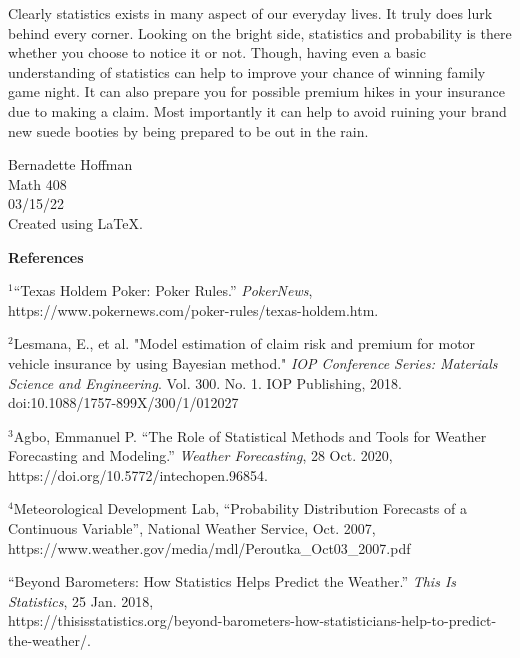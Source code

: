 \documentclass[11pt]{article}
\begin{document}
\bigskip

Clearly statistics exists in many aspect of our everyday lives. It truly does lurk behind every corner. Looking on the bright side, statistics and probability is there whether you choose to notice it or not. Though, having even a basic understanding of statistics can help to improve your chance of winning family game night. It can also prepare you for possible premium hikes in your insurance due to making a claim. Most importantly it can help to avoid ruining your brand new suede booties by being prepared to be out in the rain. 

\vspace{1in}
\begin{center}
Bernadette Hoffman \\
Math 408\\
03/15/22\\
Created using \LaTeX.
\end{center}

\newpage
\begin{center}
\Large \textbf{References}
\end{center}

\bigskip

\begin{small}

\noindent $^1$“Texas Holdem Poker: Poker Rules.” \textit{PokerNews}, 
https://www.pokernews.com/poker-rules/texas-holdem.htm.

\bigskip

\noindent $^2$Lesmana, E., et al. "Model estimation of claim risk and premium for motor vehicle insurance by using Bayesian method." \textit{IOP Conference Series: Materials Science and Engineering}. Vol. 300. No. 1. IOP Publishing, 2018. doi:10.1088/1757-899X/300/1/012027

\bigskip

\noindent $^3$Agbo, Emmanuel P. “The Role of Statistical Methods and Tools for Weather Forecasting and Modeling.” \textit{Weather Forecasting}, 28 Oct. 2020, https://doi.org/10.5772/intechopen.96854.

\bigskip

\noindent $^4$Meteorological Development Lab, “Probability Distribution Forecasts of a Continuous Variable”, National Weather Service, Oct. 2007, https://www.weather.gov/media/mdl/Peroutka_Oct03_2007.pdf

\bigskip

\noindent “Beyond Barometers: How Statistics Helps Predict the Weather.” \textit{This Is Statistics}, 25 Jan. 2018, \\
https://thisisstatistics.org/beyond-barometers-how-statisticians-help-to-predict-the-weather/.

\end{small}
\end{document}
